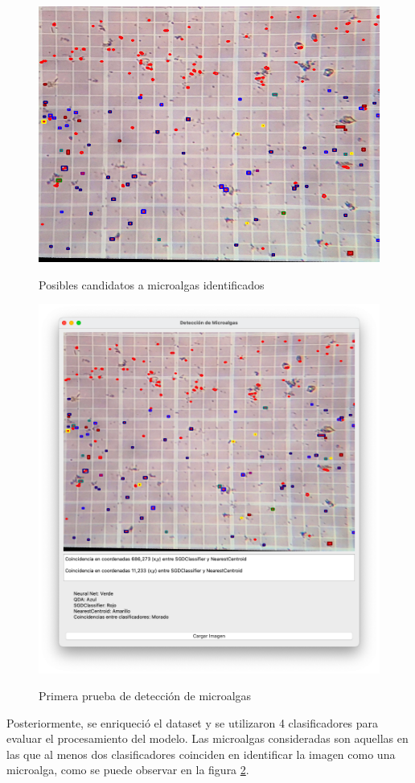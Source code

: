 \documentclass[conference]{IEEEtran}
\begin{document}
\begin{figure}[h]
    \centering
    {\includegraphics[width=.85\linewidth]{img/temp_processed_image10_1.png}}
    \caption{Posibles candidatos a microalgas identificados}
    \label{fig:2}
\end{figure}

\begin{figure}[h]
\centering
{\includegraphics[width=.90\linewidth]{img/primerPrueba.png}}
\caption{Primera prueba de detección de microalgas }
\label{fig:3}
\end{figure}
Posteriormente, se enriqueció el dataset y se utilizaron 4 clasificadores para evaluar el procesamiento del modelo. Las microalgas consideradas son aquellas en las que al menos dos clasificadores coinciden en identificar la imagen como una microalga, como se puede observar en la figura \ref{fig:3}.
\end{document}
